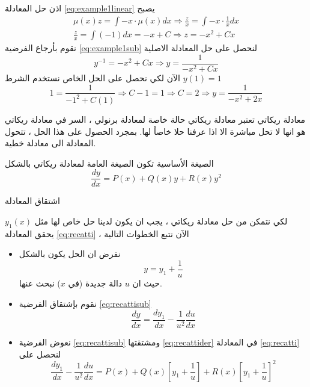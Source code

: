 		\begin{frame}
						اذن حل المعادلة \eqref{eq:example1linear} يصبح
			\begin{align*}
				\mu(x) z = \int -x \cdot \mu(x) dx
				\Rightarrow \frac{z}{x} = \int -x \cdot \frac{1}{x} dx\\
				\frac{z}{x} = \int (-1) dx = -x + C
				\Rightarrow z = -x^2 + Cx
			\end{align*}
			نقوم بأرجاع الفرضية \eqref{eq:example1sub} لنحصل على حل المعادلة الاصلية
			\[
			y^{-1} = -x^2 + Cx \Rightarrow y = \frac{1}{-x^2 + Cx}
			\]
			الآن لكي نحصل على الحل الخاص نستخدم الشرط $y(1) = 1 $ 
			\[
			1= \frac{1}{-1^2 + C(1)} \Rightarrow C-1=1\Rightarrow \boxed{C=2} \Rightarrow y = \frac{1}{-x^2 + 2x}
			\]
		\end{frame}
		
		\begin{frame}{معادلة ريكاتي}
			تعتبر معادلة ريكاتي حالة خاصة لمعادلة برنولي ، السر في معادلة ريكاتي هو انها لا تحل مباشرة الا اذا عرفنا حلا خاصاً لها. بمجرد الحصول على هذا الحل ، تتحول المعادلة الى معادلة خطية.
			\setcounter{equation}{0}
			\begin{exampleblock}{الصيغة الأساسية}
			تكون الصيغة العامة لمعادلة ريكاتي بالشكل 
			\begin{equation}
				\label{eq:recatti}
				\frac{dy}{dx} = P(x) + Q(x) y + R(x) y^2
			\end{equation}
			\end{exampleblock}
		\end{frame}
		
		\begin{frame}{اشتقاق المعادلة}
			
			لكي نتمكن من حل معادلة ريكاتي ، يجب ان يكون لدينا حل خاص لها مثل $y_1(x)$ يحقق المعادلة \eqref{eq:recatti} ، الآن نتبع الخطوات التالية
			\begin{itemize}
				\item نفرض ان الحل يكون بالشكل 
				\begin{equation}
					\label{eq:recattisub}
					y = y_1 + \frac{1}{u}
				\end{equation}
				حيث ان 
				$u$ دالة جديدة (في $x$) نبحث عنها.
				\item نقوم بإشتقاق الفرضية \eqref{eq:recattisub}
				\begin{equation}
					\label{eq:recattider}
					\frac{dy}{dx} = \frac{dy_1}{dx} - \frac{1}{u^2} \frac{du}{dx}
				\end{equation}
				\item نعوض الفرضية \eqref{eq:recattisub} ومشتقتها \eqref{eq:recattider} في المعادلة \eqref{eq:recatti} لنحصل على
				\[
				\frac{dy_1}{dx} - \frac{1}{u^2} \frac{du}{dx} = P(x) + Q(x) \left[y_1 + \frac{1}{u}\right] + R(x) \left[y_1 + \frac{1}{u}\right]^2
				\]
			\end{itemize}
		\end{frame}
		
